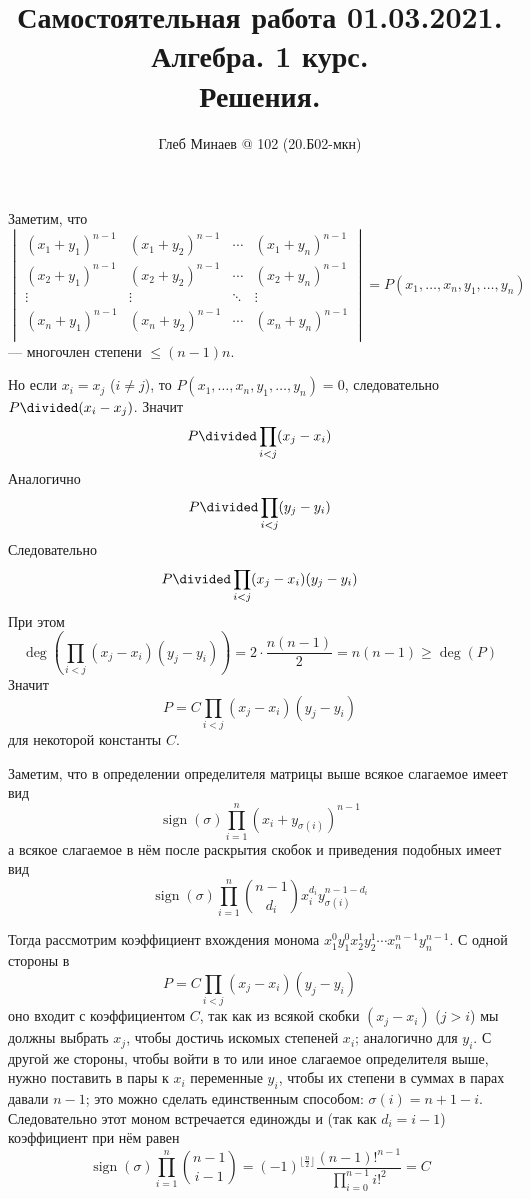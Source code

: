 \documentclass[12pt,a4paper]{article}
\title{Самостоятельная работа 01.03.2021.\\Алгебра. 1 курс.\\Решения.}
\author{Глеб Минаев @ 102 (20.Б02-мкн)}
\DeclareMathOperator{\sign}{sign}
\begin{document}
    \maketitle

    \begin{problem}{2}
        Заметим, что
        \[
            \begin{vmatrix}
                (x_1 + y_1)^{n-1}& (x_1 + y_2)^{n-1}& \cdots& (x_1 + y_n)^{n-1}\\
                (x_2 + y_1)^{n-1}& (x_2 + y_2)^{n-1}& \cdots& (x_2 + y_n)^{n-1}\\
                \vdots& \vdots& \ddots& \vdots\\
                (x_n + y_1)^{n-1}& (x_n + y_2)^{n-1}& \cdots& (x_n + y_n)^{n-1}\\
            \end{vmatrix}
            = P(x_1, \dots, x_n, y_1, \dots, y_n)
        \]
        --- многочлен степени $\leqslant (n-1)n$.

        Но если $x_i = x_j$ ($i \neq j$), то $P(x_1, \dots, x_n, y_1, \dots, y_n) = 0$, следовательно $P \divided (x_i - x_j)$. Значит
        \[P \divided \prod_{i < j} (x_j - x_i)\]
        Аналогично
        \[P \divided \prod_{i < j} (y_j - y_i)\]
        Следовательно
        \[P \divided \prod_{i < j} (x_j - x_i)(y_j - y_i)\]
        При этом
        \[\deg\left(\prod_{i < j} (x_j - x_i)(y_j - y_i)\right) = 2 \cdot \frac{n(n-1)}{2} = n(n-1) \geqslant \deg(P)\]
        Значит
        \[P = C\prod_{i < j} (x_j - x_i)(y_j - y_i)\]
        для некоторой константы $C$.

        Заметим, что в определении определителя матрицы выше всякое слагаемое имеет вид
        \[\sign(\sigma)\prod_{i=1}^n (x_i + y_{\sigma(i)})^{n-1}\]
        а всякое слагаемое в нём после раскрытия скобок и приведения подобных имеет вид
        \[\sign(\sigma)\prod_{i=1}^n \binom{n-1}{d_i} x_i^{d_i} y_{\sigma(i)}^{n-1-d_i}\]

        Тогда рассмотрим коэффициент вхождения монома $x_1^0 y_1^0 x_2^1 y_2^1 \cdots x_n^{n-1} y_n^{n-1}$. С одной стороны в
        \[P = C\prod_{i < j} (x_j - x_i)(y_j - y_i)\]
        оно входит с коэффициентом $C$, так как из всякой скобки $(x_j - x_i)$ ($j > i$) мы должны выбрать $x_j$, чтобы достичь искомых степеней $x_i$; аналогично для $y_i$. С другой же стороны, чтобы войти в то или иное слагаемое определителя выше, нужно поставить в пары к $x_i$ переменные $y_i$, чтобы их степени в суммах в парах давали $n-1$; это можно сделать единственным способом: $\sigma(i) = n+1 - i$. Следовательно этот моном встречается единожды и (так как $d_i = i-1$) коэффициент при нём равен
        \[\sign(\sigma) \prod_{i=1}^n \binom{n-1}{i-1} = (-1)^{\lfloor \frac{n}{2} \rfloor} \frac{(n-1)!^{n-1}}{\prod_{i=0}^{n-1} i!^2} = C\]


\end{problem}
\end{document}
